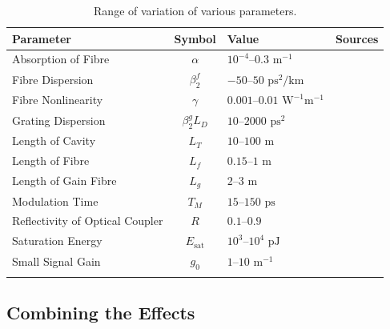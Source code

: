 \documentclass[9pt,twocolumn,twoside]{osajnl}
\newcommand{\Es}{E_{\textrm{sat}}} %
\begin{document}
 \begin{table}[tbp]
	\centering
	\caption{Range of variation of various parameters.}
 	\label{tab:values}
 	\begin{tabular}{lcll}
 		\hline\noalign{\smallskip}
 		Parameter & Symbol & Value & Sources \\
 		\hline\noalign{\smallskip}
 		Absorption of Fibre & $\alpha$ & $10^{-4}$--$0.3\text{ m}^{-1}$  & \cite{burgoyneemail, shtyrina2017, tomlinson1984, usechak2005, yarutkina2013} \\
 		Fibre Dispersion & $\beta_2^f$ & $-50$--$50 \text{ ps}^2/ \text{km}$ & \cite{agrawal2002, agrawal2013, burgoyne2014, litchinitser1997, peng2018, yarutkina2013} \\
 		Fibre Nonlinearity & $\gamma$ & $0.001$--$0.01 \text{ W}^{-1} \text{m}^{-1}$ & \cite{agrawal2013, finot2008, usechak2005, yarutkina2013} \\
 		Grating Dispersion & $\beta_2^g L_D$ & $10$--$2000 \text{ ps}^2$ & \cite{agrawal2002, agrawal2013, burgoyne2014, li1998} \\
 		Length of Cavity & $L_T$ & $10$--$100 \text{ m}$ & \cite{burgoyneemail, peng2018, tamura1996} \\
 		Length of Fibre & $L_f$ & $0.15$--$1 \text{ m}$ & \cite{burgoyneemail} \\
 		Length of Gain Fibre & $L_g$ & $2$--$3 \text{ m}$ & \cite{burgoyne2014, peng2018, shtyrina2017, tamura1993,yarutkina2013} \\
 		Modulation Time & $T_M$ & $15$--$150 \text{ ps}$ & \cite{bohun2015, burgoyneemail, burgoyne2014} \\
 		Reflectivity of Optical Coupler & $R$ & $0.1$--$0.9$ & \cite{burgoyneemail, li1998, peng2018,  tamura1993, tamura1996, yamashita2009} \\
 		Saturation Energy & $\Es$ & $10^3$--$10^4 \text{ pJ}$ & \cite{burgoyneemail, usechak2005, yarutkina2013} \\
 		Small Signal Gain & $g_0$ & $1$--$10 \text{ m}^{-1}$ & \cite{burgoyneemail, yarutkina2013} \\
 		\noalign{\smallskip}\hline
 	\end{tabular}
 \end{table}

\subsection{Combining the Effects}
\label{sec:effects}
\end{document}
